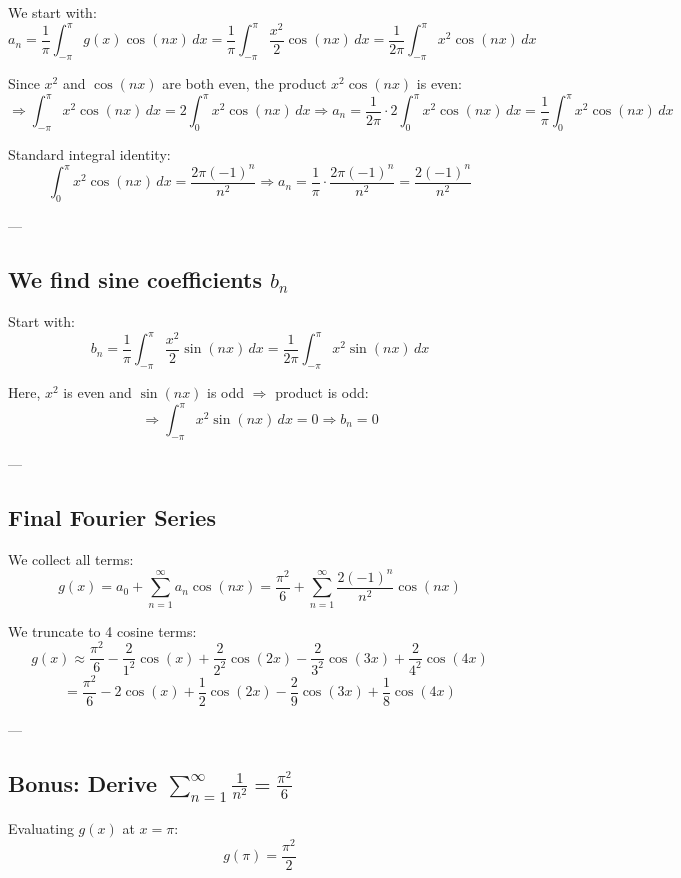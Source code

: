 \documentclass{article}
\begin{document}
We start with:
\[
a_n = \frac{1}{\pi} \int_{-\pi}^{\pi} g(x) \cos(nx) \, dx = \frac{1}{\pi} \int_{-\pi}^{\pi} \frac{x^2}{2} \cos(nx) \, dx = \frac{1}{2\pi} \int_{-\pi}^{\pi} x^2 \cos(nx) \, dx
\]

Since \( x^2 \) and \( \cos(nx) \) are both even, the product \( x^2 \cos(nx) \) is even:
\[
\Rightarrow \int_{-\pi}^{\pi} x^2 \cos(nx) \, dx = 2 \int_0^{\pi} x^2 \cos(nx) \, dx
\Rightarrow a_n = \frac{1}{2\pi} \cdot 2 \int_0^{\pi} x^2 \cos(nx) \, dx = \frac{1}{\pi} \int_0^{\pi} x^2 \cos(nx) \, dx
\]

Standard integral identity:
\[
\int_0^{\pi} x^2 \cos(nx) \, dx = \frac{2\pi (-1)^n}{n^2}
\Rightarrow a_n = \frac{1}{\pi} \cdot \frac{2\pi (-1)^n}{n^2} = \frac{2(-1)^n}{n^2}
\]

---

\subsection*{We find sine coefficients \( b_n \)}

Start with:
\[
b_n = \frac{1}{\pi} \int_{-\pi}^{\pi} \frac{x^2}{2} \sin(nx) \, dx = \frac{1}{2\pi} \int_{-\pi}^{\pi} x^2 \sin(nx) \, dx
\]

Here, \( x^2 \) is even and \( \sin(nx) \) is odd \( \Rightarrow \) product is odd:
\[
\Rightarrow \int_{-\pi}^{\pi} x^2 \sin(nx) \, dx = 0 \Rightarrow b_n = 0
\]

---

\subsection*{Final Fourier Series}

We collect all terms:
\[
g(x) = a_0 + \sum_{n=1}^{\infty} a_n \cos(nx) = \frac{\pi^2}{6} + \sum_{n=1}^{\infty} \frac{2(-1)^n}{n^2} \cos(nx)
\]

We truncate to 4 cosine terms:
\[
g(x) \approx \frac{\pi^2}{6} - \frac{2}{1^2} \cos(x) + \frac{2}{2^2} \cos(2x) - \frac{2}{3^2} \cos(3x) + \frac{2}{4^2} \cos(4x)
\]
\[
= \frac{\pi^2}{6} - 2 \cos(x) + \frac{1}{2} \cos(2x) - \frac{2}{9} \cos(3x) + \frac{1}{8} \cos(4x)
\]

---

\subsection*{Bonus: Derive \( \sum_{n=1}^{\infty} \frac{1}{n^2} = \frac{\pi^2}{6} \)}
Evaluating \( g(x) \) at \( x = \pi \):
\[
g(\pi) = \frac{\pi^2}{2}
\]
\end{document}

